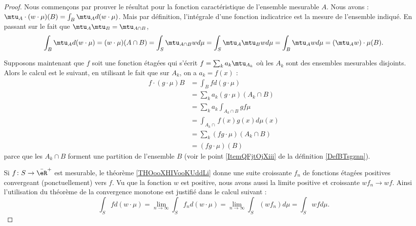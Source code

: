 \begin{proof}
    Nous commençons par prouver le résultat pour la fonction caractéristique de l'ensemble mesurable \( A\). Nous avons : $\mtu_A\cdot(w\cdot \mu)(B)=\int_B\mtu_Ad(w\cdot \mu)$. Mais par définition, l'intégrale d'une fonction indicatrice est la mesure de l'ensemble indiqué. En passant sur le fait que \( \mtu_A\mtu_B=\mtu_{A\cap B}\), 
    \begin{equation}
        \int_B\mtu_Ad(w\cdot \mu)=   (w\cdot\mu)(A\cap B)=\int_S\mtu_{A\cap B}wd\mu=\int_S\mtu_A\mtu_Bwd\mu=\int_B\mtu_Awd\mu=(\mtu_Aw)\cdot\mu(B).
    \end{equation}

    Supposons maintenant que \( f\) soit une fonction étagées qui s'écrit \( f=\sum_ka_k\mtu_{A_k}\) où les \( A_k\) sont des ensembles mesurables disjoints. Alors le calcul est le suivant, en utilisant le fait que sur \( A_k\), on a \( a_k=f(x)\) :
    \begin{subequations}
        \begin{align}
            f\cdot(g\cdot \mu)B&=\int_Bfd(g\cdot \mu)\\
            &=\sum_ka_k(g\cdot\mu)(A_k\cap B)\\
            &=\sum_ka_k\int_{A_k\cap B}gf\mu\\
            &=\int_{A_k\cap}f(x)g(x)d\mu(x)\\
            &=\sum_k(fg\cdot\mu)(A_k\cap B)\\
            &=(fg\cdot\mu)(B)
        \end{align}
    \end{subequations}
    parce que les \( A_k\cap B\) forment une partition de l'ensemble \( B\) (voir le point \ref{ItemQFjtOjXiii} de la définition \ref{DefBTsgznn}).

    Si \( f\colon S\to \bar\eR^+\) est mesurable, le théorème \ref{THOooXHIVooKUddLi} donne une suite croissante \( f_n\) de fonctions étagées positives convergeant (ponctuellement) vers \( f\). Vu que la fonction \( w\) est positive, nous avons aussi la limite positive et croissante \( wf_n\to wf\). Ainsi l'utilisation du théorème de la convergence monotone est justifié dans le calcul suivant :
    \begin{equation}
        \int_Sfd(w\cdot \mu)=\lim_{n\to \infty} \int_Sf_nd(w\cdot\mu)=\lim_{n\to \infty} \int_S(wf_n)d\mu=\int_Swfd\mu.
    \end{equation}
    

\end{proof}
